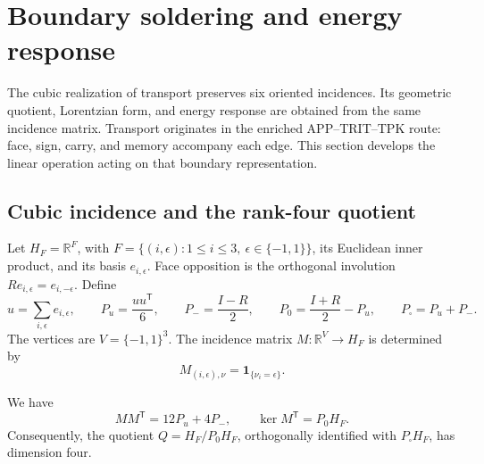 
\section{Boundary soldering and energy response}
\label{vii:sec:pantalla-respuesta}

The cubic realization of transport preserves six oriented incidences.
Its geometric quotient, Lorentzian form, and energy response
are obtained from the same incidence matrix. Transport originates in
the enriched APP--TRIT--TPK route: face, sign, carry, and
memory accompany each edge. This section develops the
linear operation acting on that boundary representation.

\subsection{Cubic incidence and the rank-four quotient}
\label{vii:sec:cociente-pantalla}

Let \(H_F=\mathbb R^F\), with
\(F=\{(i,\epsilon):1\leq i\leq3,\ \epsilon\in\{-1,1\}\}\),
its Euclidean inner product, and its basis \(e_{i,\epsilon}\).
Face opposition is the orthogonal involution
\(Re_{i,\epsilon}=e_{i,-\epsilon}\). Define
\[
 u=\sum_{i,\epsilon}e_{i,\epsilon},\qquad
 P_u=\frac{uu^{\mathsf T}}6,\qquad P_-=\frac{I-R}{2},\qquad
 P_0=\frac{I+R}{2}-P_u,\qquad P_\square=P_u+P_-.
\]
The vertices are \(V=\{-1,1\}^3\). The incidence matrix
\(M:\mathbb R^V\longrightarrow H_F\) is determined by
\[
 M_{(i,\epsilon),\nu}=\mathbf1_{\{\nu_i=\epsilon\}}.
\]

\begin{proposition}
\label{vii:prop:incidencia}
We have
\[
 MM^{\mathsf T}=12P_u+4P_-,
 \qquad
 \ker M^{\mathsf T}=P_0H_F.
\]
Consequently, the quotient
\(Q=H_F/P_0H_F\), orthogonally identified with
\(P_\square H_F\), has dimension four.
\end{proposition}

